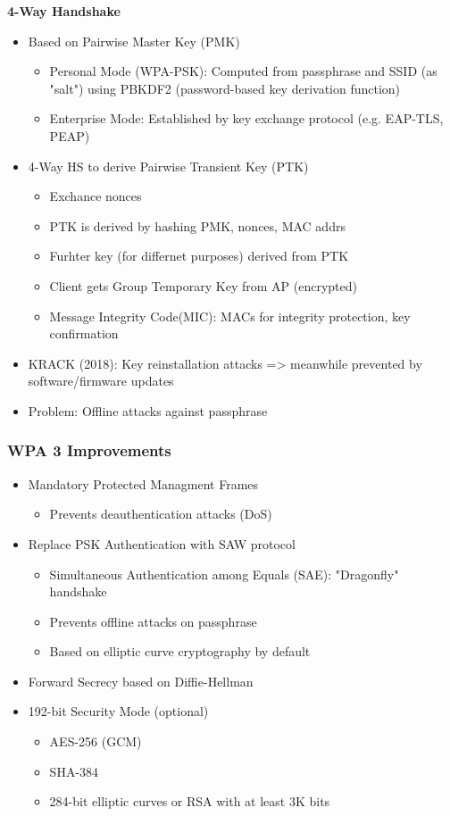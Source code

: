 \textbf{4-Way Handshake}\\
\begin{itemize}
  \item Based on Pairwise Master Key (PMK)
    \begin{itemize}
      \item Personal Mode (WPA-PSK):
        Computed from passphrase and SSID (as "salt") using PBKDF2 (password-based key derivation function)
      \item Enterprise Mode: Established by key exchange protocol (e.g. EAP-TLS, PEAP)
    \end{itemize}
  \item 4-Way HS to derive Pairwise Transient Key (PTK) 
    \begin{itemize}
      \item Exchance nonces
      \item PTK is derived by hashing PMK, nonces, MAC addrs 
      \item Furhter key (for differnet purposes) derived from PTK 
      \item Client gets Group Temporary Key from AP (encrypted) 
      \item Message Integrity Code(MIC): MACs for integrity protection, key confirmation 
    \end{itemize}
  \item KRACK (2018): Key reinstallation attacks => meanwhile prevented by software/firmware updates 
  \item Problem: Offline attacks against passphrase 
\end{itemize}

\subsubsection{WPA 3 Improvements}
\begin{itemize}
  \item Mandatory Protected Managment Frames
    \begin{itemize}
      \item Prevents deauthentication attacks (DoS)
    \end{itemize}
  \item Replace PSK Authentication with SAW protocol 
    \begin{itemize}
      \item Simultaneous Authentication among Equals (SAE):
        "Dragonfly" handshake
      \item Prevents offline attacks on passphrase 
      \item Based on elliptic curve cryptography by default
    \end{itemize}
  \item Forward Secrecy based on Diffie-Hellman 
  \item 192-bit Security Mode (optional) 
    \begin{itemize}
      \item AES-256 (GCM)
      \item SHA-384 
      \item 284-bit elliptic curves or RSA with at least 3K bits 
    \end{itemize}
\end{itemize}

